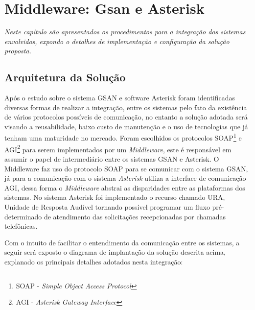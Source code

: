 \chapter[Middleware: GSAN e Asterisk]{\textbf{M}iddleware: \textbf{G}san e \textbf{A}sterisk}

\textit{Neste capítulo são apresentados os procedimentos para a integração dos sistemas envolvidos, expondo o detalhes de implementação e configuração da solução proposta.}


\section{Arquitetura da Solução}

Após o estudo sobre o sistema GSAN e software Asterisk foram identificadas diversas formas de realizar a integração, entre os sistemas pelo fato da existência de vários protocolos possíveis de comunicação, no entanto a solução adotada será visando a reusabilidade, baixo custo de manutenção e o uso de tecnologias que já tenham uma maturidade no mercado. Foram escolhidos os protocolos SOAP\footnote{SOAP - \textit{Simple Object Access Protocol}} e AGI\footnote{AGI - \textit{Asterisk Gateway Interface}} para serem implementados por um \textit{Middleware}, este é responsável em assumir o papel de intermediário entre os sistemas GSAN e Asterisk. O Middleware faz uso do protocolo SOAP para se comunicar com o sistema GSAN, já para a comunicação com o sistema \textit{Asterisk} utiliza a interface de comunicação AGI, dessa forma o \textit{Middleware} abstrai as disparidades entre as plataformas dos sistemas. No sistema Asterisk foi implementado o recurso chamado URA, Unidade de Resposta Audível tornando possível programar um fluxo pré-determinado de atendimento das solicitações recepcionadas por chamadas telefônicas.

Com o intuito de facilitar o entendimento da comunicação entre os sistemas, a seguir será exposto o diagrama de implantação da solução descrita acima, explanado os principais detalhes adotados nesta integração:


